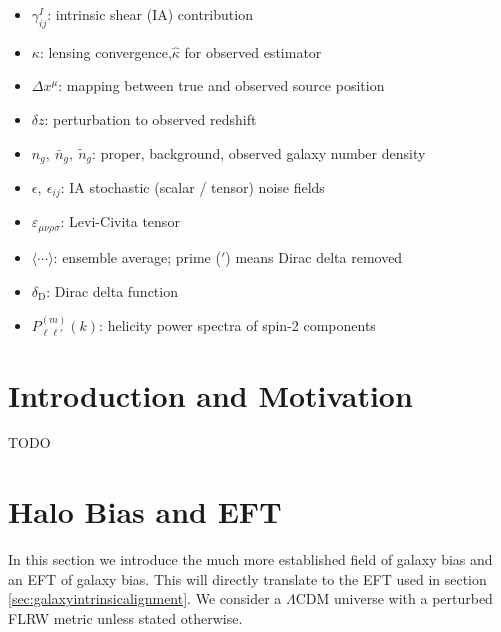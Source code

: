 \documentclass[11pt]{article}
\newcommand{\deltaD}{\delta_{\mathrm D}}
\begin{document}
\begin{itemize}
    \item[]$\gamma^{I}_{ij}$: intrinsic shear (IA) contribution
    \item[]$\kappa$: lensing convergence,\quad $\hat \kappa$ for observed estimator
    \item[]$\Delta x^\mu$: mapping between true and observed source position
    \item[]$\delta z$: perturbation to observed redshift
    \item[]$n_g,\ \bar n_g,\ \tilde n_g$: proper, background, observed galaxy number density
    \item[]$\epsilon,\ \epsilon_{ij}$: IA stochastic (scalar / tensor) noise fields
    \item[]$\varepsilon_{\mu\nu\rho\sigma}$: Levi-Civita tensor
    \item[]$\langle\cdots\rangle$: ensemble average; prime (${}'$) means Dirac delta removed
    \item[]$\deltaD$: Dirac delta function
    \item[]$P^{(m)}_{\ell\ell'}(k)$: helicity power spectra of spin-2 components
  \end{itemize}
  \normalsize
  

\section{Introduction and Motivation}
TODO

\section{Halo Bias and EFT}
In this section we introduce the much more established field of galaxy bias and an EFT of galaxy bias. This will directly translate to the EFT used in section \ref{sec:galaxyintrinsicalignment}. We consider a $\Lambda$CDM universe with a perturbed FLRW metric unless stated otherwise.
\end{document}
